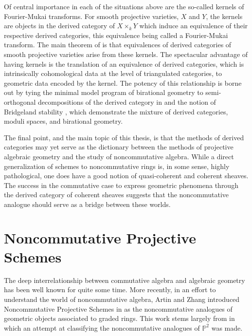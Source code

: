 Of central importance in each of the situations above are the so-called kernels of Fourier-Mukai transforms.
For smooth projective varieties, \(X\) and \(Y\), the kernels are objects in the derived category of \(X \times_k Y\) which induce an equivalence of their respective derived categories, this equivalence being called a Fourier-Mukai transform.
The main theorem of \parencite{Orlov97} is that equivalences of derived categories of smooth projective varieties arise from these kernels.
The spectacular advantage of having kernels is the translation of an equivalence of derived categories, which is intrinsically cohomological data at the level of triangulated categories, to geometric data encoded by the kernel.
The potency of this relationship is borne out by tying the minimal model program of birational geometry to semi-orthogonal decompositions of the derived category in \parencite{Bridgeland02,Kawamata02} and the notion of Bridgeland stability \parencite{Bridgeland07, ABCH13, Bayer-Macri14a, Bayer-Macri14b}, which demonstrate the mixture of derived categories, moduli spaces, and birational geometry.

The final point, and the main topic of this thesis, is that the methods of derived categories may yet serve as the dictionary between the methods of projective algebraic geometry and the study of noncommutative algebra.
While a direct generalization of schemes to noncommutative rings is, in some sense, highly pathological, one does have a good notion of quasi-coherent and coherent sheaves.
The success in the commutative case to express geometric phenomena through the derived category of coherent sheaves suggests that the noncommutative analogue should serve as a bridge between these worlds.

\section*{Noncommutative Projective Schemes}
The deep interrelationship between commutative algebra and algebraic geometry has been well known for quite some time.
More recently, in an effort to understand the world of noncommutative algebra, Artin and Zhang introduced Noncommutative Projective Schemes in \parencite{AZ94} as the noncommutative analogues of geometric objects associated to graded rings.
This work stems largely from \parencite{AS87} in which an attempt at classifying the noncommutative analogues of \(\mathbb{P}^2\) was made.

